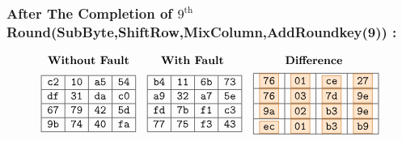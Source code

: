 \subsubsection{After The Completion of $9^{\text{th}}$ Round(SubByte,ShiftRow,MixColumn,AddRoundkey(9)) :}
\[
\begin{array}{ccc}
\textbf{Without Fault} & \textbf{With Fault } & \textbf{Difference } \\[1ex]
\begin{array}{|c|c|c|c|}
    \hline
    \texttt{c2} & \texttt{10} & \texttt{a5} & \texttt{54} \\
    \hline
    \texttt{df} & \texttt{31} & \texttt{da} & \texttt{c0} \\
    \hline
    \texttt{67} & \texttt{79} & \texttt{42} & \texttt{5d} \\
    \hline
    \texttt{9b} & \texttt{74} & \texttt{40} & \texttt{fa} \\
    \hline
\end{array} 
&

\begin{array}{|c|c|c|c|}
    \hline
    \texttt{b4} & \texttt{11} & \texttt{6b} & \texttt{73} \\
    \hline
    \texttt{a9} & \texttt{32} & \texttt{a7} & \texttt{5e} \\
    \hline
    \texttt{fd} & \texttt{7b} & \texttt{f1} & \texttt{c3} \\
    \hline
    \texttt{77} & \texttt{75} & \texttt{f3} & \texttt{43} \\
    \hline
    \end{array}

    &

    \begin{array}{|c|c|c|c|}
        \hline
        \fcolorbox{orange!80!black}{orange!20}{\texttt{76}} & \fcolorbox{orange!80!black}{orange!20}{\texttt{01}} & \fcolorbox{orange!80!black}{orange!20}{\texttt{ce}} & \fcolorbox{orange!80!black}{orange!20}{\texttt{27}} \\
        \hline
        \fcolorbox{orange!80!black}{orange!20}{\texttt{76}} & \fcolorbox{orange!80!black}{orange!20}{\texttt{03}} & \fcolorbox{orange!80!black}{orange!20}{\texttt{7d}} & \fcolorbox{orange!80!black}{orange!20}{\texttt{9e}} \\
        \hline
        \fcolorbox{orange!80!black}{orange!20}{\texttt{9a}} & \fcolorbox{orange!80!black}{orange!20}{\texttt{02}} & \fcolorbox{orange!80!black}{orange!20}{\texttt{b3}} & \fcolorbox{orange!80!black}{orange!20}{\texttt{9e}} \\
        \hline
        \fcolorbox{orange!80!black}{orange!20}{\texttt{ec}} & \fcolorbox{orange!80!black}{orange!20}{\texttt{01}} & \fcolorbox{orange!80!black}{orange!20}{\texttt{b3}} & \fcolorbox{orange!80!black}{orange!20}{\texttt{b9}} \\
        \hline
    \end{array}
\end{array}
\]
